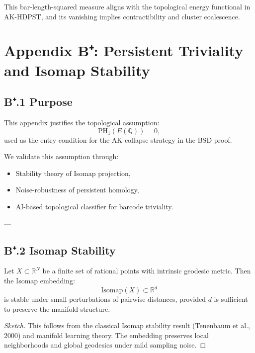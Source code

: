 This bar-length-squared measure aligns with the topological energy functional in AK-HDPST, and its vanishing implies contractibility and cluster coalescence.



\section*{Appendix B⁺: Persistent Triviality and Isomap Stability}

\subsection*{B⁺.1 Purpose}

This appendix justifies the topological assumption:
\[
\mathrm{PH}_1(E(\mathbb{Q})) = 0,
\]
used as the entry condition for the AK collapse strategy in the BSD proof.

We validate this assumption through:
\begin{itemize}
  \item Stability theory of Isomap projection,
  \item Noise-robustness of persistent homology,
  \item AI-based topological classifier for barcode triviality.
\end{itemize}

---

\subsection*{B⁺.2 Isomap Stability}

\begin{proposition}
Let \( X \subset \mathbb{R}^N \) be a finite set of rational points with intrinsic geodesic metric.  
Then the Isomap embedding:
\[
\mathrm{Isomap}(X) \subset \mathbb{R}^d
\]
is stable under small perturbations of pairwise distances, provided \( d \) is sufficient to preserve the manifold structure.
\end{proposition}

\begin{proof}[Sketch]
This follows from the classical Isomap stability result (Tenenbaum et al., 2000) and manifold learning theory.  
The embedding preserves local neighborhoods and global geodesics under mild sampling noise.
\end{proof}

